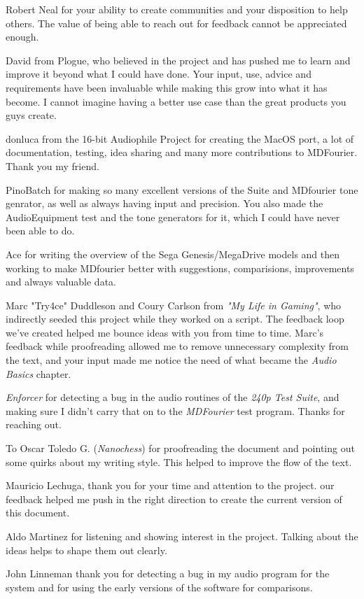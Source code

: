 \documentclass[10pt,a4paper]{report}
\begin{document}
\begin{appendices}
Robert Neal for your ability to create communities and your disposition to help others. The value of being able to reach out for feedback cannot be appreciated enough.

David from Plogue, who believed in the project and has pushed me to learn and improve it beyond what I could have done. Your input, use, advice and requirements have been invaluable while making this grow into what it has become. I cannot imagine having a better use case than the great products you guys create.

donluca from the 16-bit Audiophile Project for creating the MacOS port, a lot of documentation, testing, idea sharing and many more contributions to MDFourier. Thank you my friend.

PinoBatch for making so many excellent versions of the Suite and MDfourier tone genrator, as well as always having input and precision. You also made the AudioEquipment test and the tone generators for it, which I could have never been able to do.

Ace for writing the overview of the Sega Genesis/MegaDrive models and then working to make MDfourier better with suggestions, comparisions, improvements and always valuable data.

Marc "Try4ce" Duddleson and Coury Carlson from \textit{"My Life in Gaming"}, who indirectly seeded this project while they worked on a script. The feedback loop we've created helped me bounce ideas with you from time to time. Marc's feedback while proofreading allowed me to remove unnecessary complexity from the text, and your input made me notice the need of what became the \textit{Audio Basics} chapter.

\textit{Enforcer} for detecting a bug in the audio routines of the \textit{240p Test Suite}, and making sure I didn't carry that on to the \textit{MDFourier} test program. Thanks for reaching out.

To Oscar Toledo G. (\textit{Nanochess}) for proofreading the document and pointing out some quirks about my writing style. This helped to improve the flow of the text.

Mauricio Lechuga, thank you for your time and attention to the project. our feedback helped me push in the right direction to create the current version of this document. 

Aldo Martinez for listening and showing interest in the project. Talking about the ideas helps to shape them out clearly.

John Linneman thank you for detecting a bug in my audio program for the system and for using the early versions of the software for comparisons.


\end{appendices}
\end{document}
